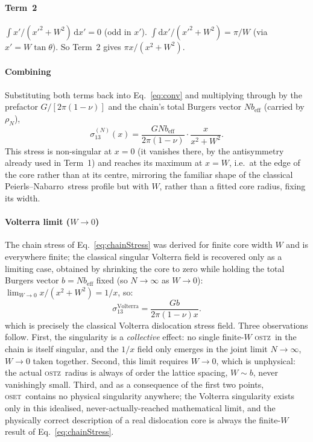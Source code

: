\documentclass[3p]{elsarticle}
\newcommand{\OSTZ}{\textsc{ostz}}
\newcommand{\OSET}{\textsc{oset}}
\newcommand{\beff}{b_\mathrm{eff}}
\newcommand{\PN}{Peierls--Nabarro}
\begin{document}
\paragraph{Term~2}
$\int x'/(x'^2+W^2)\,\mathrm dx'=0$ (odd in $x'$).
$\int\mathrm dx'/(x'^2+W^2)=\pi/W$
(via $x'=W\tan\theta$).
So Term~2 gives $\pi x/(x^2+W^2)$.

\paragraph{Combining}
Substituting both terms back into Eq.~\eqref{eq:conv} and
multiplying through by the prefactor $G/[2\pi(1-\nu)]$ and the
chain's total Burgers vector $N\beff$ (carried by $\rho_N$),
\begin{equation}
  \boxed{\sigma_{13}^{(N)}(x)=\frac{GN\beff}{2\pi(1-\nu)}
  \cdot\frac{x}{x^2+W^2}.}
  \label{eq:chainStress}
\end{equation}
This stress is non-singular at $x=0$ (it vanishes there, by the
antisymmetry already used in Term~1) and reaches its maximum at
$x=W$, i.e.\ at the edge of the core rather than at its centre,
mirroring the familiar shape of the classical \PN\ stress profile
but with $W$, rather than a fitted core radius, fixing its width.

\paragraph{Volterra limit ($W\to0$)}
The chain stress of Eq.~\eqref{eq:chainStress} was derived for finite
core width $W$ and is everywhere finite; the classical singular
Volterra field is recovered only as a limiting case, obtained by
shrinking the core to zero while holding the total Burgers vector
$b=N\beff$ fixed (so $N\to\infty$ as $W\to0$):
$\lim_{W\to0}x/(x^2+W^2)=1/x$, so:
\begin{equation}
  \sigma_{13}^\text{Volterra}=\frac{Gb}{2\pi(1-\nu)x}.
  \label{eq:volterra}
\end{equation}
which is precisely the classical Volterra dislocation stress field.
Three observations follow. First, the singularity is a
\emph{collective} effect: no single finite-$W$ \OSTZ\ in the chain is
itself singular, and the $1/x$ field only emerges in the joint limit
$N\to\infty$, $W\to0$ taken together. Second, this limit requires
$W\to0$, which is unphysical: the actual \OSTZ\ radius is always of
order the lattice spacing, $W\sim b$, never vanishingly small. Third,
and as a consequence of the first two points, \OSET\ contains no
physical singularity anywhere; the Volterra singularity exists only
in this idealised, never-actually-reached mathematical limit, and
the physically correct description of a real dislocation core is
always the finite-$W$ result of Eq.~\eqref{eq:chainStress}.
\end{document}
